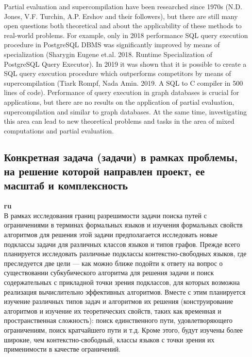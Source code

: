\documentclass[12pt]{article}  %
\theoremstyle{remark}
\begin{document}
Partial evaluation and supercompilation have been researched since 1970s (N.D. Jones, V.F. Turchin, A.P. Ershov and their followers), but there are still many open questions both theoretical and about the applicability of these methods to real-world problems. For example, only in 2018 performance SQL query execution procedure in PostgreSQL DBMS was significantly improved by means of specialization (Sharygin Eugene et.al. 2018. Runtime Specialization of PostgreSQL Query Executor). In 2019 it was shown that it is possible to create a SQL query execution procedure which outperforms competitors by means of supercompilation (Tiark Rompf, Nada Amin. 2019. A SQL to C compiler in 500 lines of code). Performance of query execution in graph databases is crucial for applications, but there are no results on the application of partial evaluation, supercompilation and similar to graph databases. At the same time, investigating this area can lead to new theoretical problems and tasks in the area of mixed computations and partial evaluation.

\subsection{Конкретная задача (задачи) в рамках проблемы, на решение которой направлен проект, ее масштаб и комплексность}

\textbf{ru}\\
%
В рамках исследования границ разрешимости задачи поиска путей с ограничениями в терминах формальных языков и изучения формальных свойств алгоритмов для решения этой задачи предполагается исследовать новые подклассы задачи для различных классов языков и типов графов. Прежде всего планируется исследовать различные подклассы контекстно-свободных языков, где преследуется две цели — как можно ближе подойти к ответу на вопрос о существовании субкубического алгоритма для решения задачи и поиск содержательных с прикладной точки зрения подклассов, для которых возможна реализация вычислительно эффективных алгоритмов. Вместе с этим планируется изучение различных типов задач и алгоритмов их решения (конструирование алгоритмов и изучение их теоретических свойств, таких как временная и пространственная сложность): поиск единственного пути, удовлетворяющего ограничениям, поиск кратчайшего пути и т.д. Кроме этого, будут изучены более широкие, чем контекстно-свободный, классы языков с точки зрения их применимости в качестве ограничений.
\end{document}
